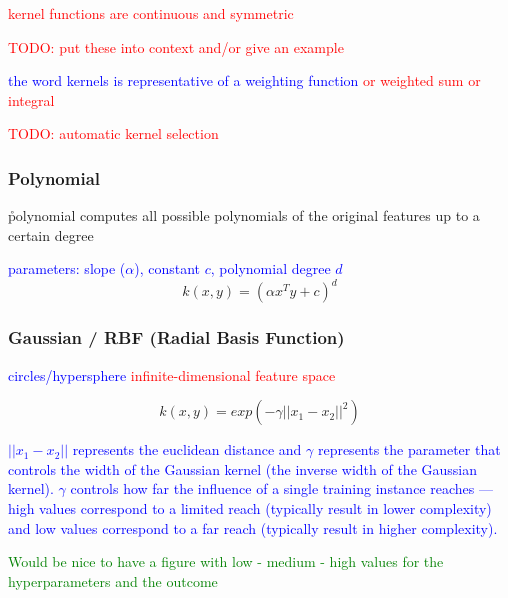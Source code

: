 \textcolor{red}{kernel functions are continuous and symmetric}

\textcolor{red}{TODO: put these into context and/or give an example}

\textcolor{blue}{the word kernels is representative of a weighting function \textcolor{red}{or weighted sum or integral}}



\textcolor{red}{TODO: automatic kernel selection}

\subsubsection{Polynomial}

\r{polynomial computes all possible polynomials of the original features up to a certain degree}

\textcolor{blue}{parameters: slope ($\alpha$), constant $c$, polynomial degree $d$}
\begin{equation}
{k(x, y) = (\alpha x^T y + c)^d}
\label{eq:kernel_polynomial_eq}
\end{equation}

\subsubsection{Gaussian / RBF (Radial Basis Function)}

\textcolor{blue}{circles/hypersphere}
\textcolor{red}{infinite-dimensional feature space}

\begin{equation}
{k(x, y) = exp(- \gamma || x_1 - x_2 || ^2 ) }
\label{eq:kernel_guassian_rbf_eq}
\end{equation}

\textcolor{blue}{$|| x_1 - x_2 ||$ represents the euclidean distance and $\gamma$ represents the parameter that controls the width of the Gaussian kernel (the inverse width of the Gaussian kernel). $\gamma$ controls how far the influence of a single training instance reaches --- high values correspond to a limited reach (typically result in lower complexity) and low values correspond to a far reach (typically result in higher complexity).}

\textcolor{green}{Would be nice to have a figure with low - medium - high values for the hyperparameters and the outcome}


